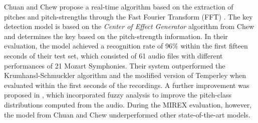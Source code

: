 

Chuan and Chew propose a real-time algorithm based on the
extraction of pitches and pitch-strengths through the Fast
Fourier Transform (FFT) \cite{chuan2005polyphonic}. The key
detection model is based on the \emph{Center of Effect
Generator} algorithm from Chew \cite{chew2002spiral} and
determines the key based on the pitch-strength information.
In their evaluation, the model achieved a recognition rate
of 96\% within the first fifteen seconds of their test set,
which consisted of 61 audio files with different
performances of 21 Mozart Symphonies. Their system
outperformed the Krumhansl-Schmuckler algorithm and the
modified version of Temperley when evaluated within the
first seconds of the recordings. A further improvement was
proposed in \cite{chuan2005fuzzy}, which incorporated fuzzy
analysis to improve the pitch-class distributions computed
from the audio. During the MIREX evaluation, however, the
model from Chuan and Chew underperformed other
state-of-the-art models.


